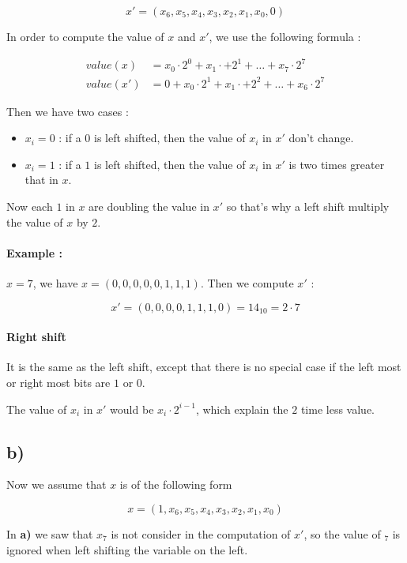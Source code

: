\documentclass[a4paper,11pt]{report}
\begin{document}
\[
  x' = (x_6,x_5,x_4,x_3,x_2,x_1,x_0,0)
\]

In order to compute the value of $x$ and $x'$, we use the following formula :

\begin{align*}
  value(x) &= x_0 \cdot 2^0 + x_1 \cdot + 2^1 + \dots + x_7 \cdot 2^7 \\
  value(x') &= 0 + x_0 \cdot 2^1 + x_1 \cdot + 2^2 + \dots + x_6 \cdot 2^7
\end{align*}

Then we have two cases :
\begin{itemize}
\item $x_i = 0$ : if a $0$ is left shifted, then the value of $x_i$ in $x'$
  don't change.
\item $x_i = 1$ : if a $1$ is left shifted, then the value of $x_i$ in $x'$ is
  two times greater that in $x$.
\end{itemize}

Now each $1$ in $x$ are doubling the value in $x'$ so that's why a left shift
multiply the value of $x$ by $2$.

\paragraph{Example : } $x = 7$, we have $x = (0,0,0,0,0,1,1,1)$. Then we compute
$x'$ :

\[
  x' = (0,0,0,0,1,1,1,0) = 14_{10} = 2 \cdot 7
\]

\paragraph{Right shift}

It is the same as the left shift, except that there is no special case if the
left most or right most bits are $1$ or $0$.

The value of $x_i$ in $x'$ would be $x_i \cdot 2^{i-1}$, which explain the $2$
time less value.

\subsection*{b)}

Now we assume that $x$ is of the following form

\[
  x = (1,x_6,x_5,x_4,x_3,x_2,x_1,x_0)
\]

In \textbf{a)} we saw that $x_7$ is not consider in the computation of $x'$, so
the value of $_7$ is ignored when left shifting the variable on the left.
\end{document}
